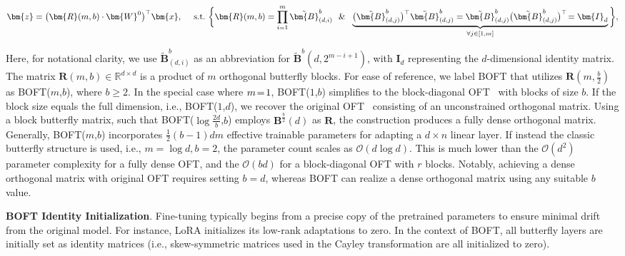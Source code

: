 \begin{equation}
    \begin{aligned}\nonumber
    \bm{z}=\big(\bm{R}(m,b)\cdot\bm{W}^0\big)^\top\bm{x},~~~~\text{s.t.}~\bigg{\{}\bm{R}(m,b)=\prod_{i=1}^m \tilde{\bm{B}}^b_{(d,i)}~~\&~~\underbrace{\big(\tilde{\bm{B}}^b_{(d,j)}\big)^\top\tilde{\bm{B}}^b_{(d,j)}=\tilde{\bm{B}}^b_{(d,j)}\big(\tilde{\bm{B}}^b_{(d,j)}\big)^\top\!=\bm{I}_d}_{\forall j\in [1, m]}\bigg{\}},
    \end{aligned}
\end{equation}

Here, for notational clarity, we use $\tilde{\bm{B}}^b_{(d,i)}$ as an abbreviation for $\tilde{\bm{B}}^b(d,2^{m - i+1})$, with $\bm{I}_d$ representing the $d$-dimensional identity matrix. The matrix $\bm{R}(m,b)\in\mathbb{R}^{d\times d}$ is a product of $m$ orthogonal butterfly blocks. For ease of reference, we label BOFT that utilizes $\bm{R}(m,\frac{b}{2})$ as BOFT($m$,$b$), where $b \geq 2$. In the special case where $\thickmuskip=2mu \medmuskip=2mu m=1$, BOFT($1$,$b$) simplifies to the block-diagonal OFT~\cite{qiu2023controlling} with blocks of size $b$. If the block size equals the full dimension, i.e., BOFT($1$,$d$), we recover the original OFT~\cite{qiu2023controlling} consisting of an unconstrained orthogonal matrix. Using a block butterfly matrix, such that BOFT($\log \frac{2d}{b}$,$b$) employs $\bm{B}^{\frac{b}{2}}(d)$ as $\bm{R}$, the construction produces a fully dense orthogonal matrix. Generally, BOFT($m$,$b$) incorporates $\frac{1}{2}(b-1)dm$ effective trainable parameters for adapting a $d\times n$ linear layer. If instead the classic butterfly structure is used, i.e., $m = \log d, b = 2$, the parameter count scales as $\mathcal{O}(d\log d)$. This is much lower than the $\mathcal{O}(d^2)$ parameter complexity for a fully dense OFT, and the $\mathcal{O}(bd)$ for a block-diagonal OFT with $r$ blocks. Notably, achieving a dense orthogonal matrix with original OFT requires setting $b = d$, whereas BOFT can realize a dense orthogonal matrix using any suitable $b$ value.

\textbf{BOFT Identity Initialization}. Fine-tuning typically begins from a precise copy of the pretrained parameters to ensure minimal drift from the original model. For instance, LoRA initializes its low-rank adaptations to zero. In the context of BOFT, all butterfly layers are initially set as identity matrices (i.e., skew-symmetric matrices used in the Cayley transformation are all initialized to zero).

